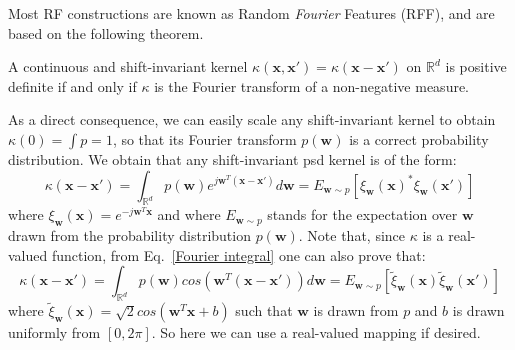 Most RF constructions are known as Random \emph{Fourier} Features (RFF), and are based on the following theorem.
\begin{theorem}
	A continuous and shift-invariant kernel $\kappa(\mathbf{x},\mathbf{x}')=\kappa(\mathbf{x}-\mathbf{x}')$ on $\mathbb{R}^d$ is positive definite if and only if $\kappa$ is the Fourier transform of a non-negative measure.
\end{theorem}
As a direct consequence, we can easily scale any shift-invariant kernel to obtain $\kappa(0) = \int p = 1$, so that its Fourier transform $p(\mathbf{w})$ is a correct probability distribution. We obtain that any shift-invariant psd kernel is of the form:
\begin{equation}
\label{Fourier integral}
\kappa(\mathbf{x}-\mathbf{x}')=\int_{\mathbb{R}^d}p(\mathbf{w})e^{j\mathbf{w}^T(\mathbf{x}-\mathbf{x}')}d\mathbf{w}= E_{\mathbf{w}\sim p}[\xi_\mathbf{w}(\mathbf{x})^*\xi_\mathbf{w}(\mathbf{x}')]
\end{equation}
where $\xi_\mathbf{w}(\mathbf{x})=e^{-j\mathbf{w}^T\mathbf{x}}$ and where $E_{\mathbf{w}\sim p}$ stands for the expectation over $\mathbf{w}$ drawn from the probability distribution $p(\mathbf{w})$. Note that, since $\kappa$ is a real-valued function, from Eq.~\ref{Fourier integral} one can also prove that:
\begin{equation}
\label{real Fourier integral}
\kappa(\mathbf{x}-\mathbf{x}')=\int_{\mathbb{R}^d}p(\mathbf{w})cos({\mathbf{w}^T(\mathbf{x}-\mathbf{x}')})d\mathbf{w}=E_{\mathbf{w}\sim p}[\tilde \xi_\mathbf{w}(\mathbf{x})\tilde \xi_\mathbf{w}(\mathbf{x}')]
\end{equation}
where $\tilde \xi_\mathbf{w}(\mathbf{x})=\sqrt{2}cos(\mathbf{w}^T\mathbf{x}+b)$ such that $\mathbf{w}$ is drawn from $p$ and $b$ is drawn uniformly from $[0,2\pi]$. So here we can use a real-valued mapping if desired.

